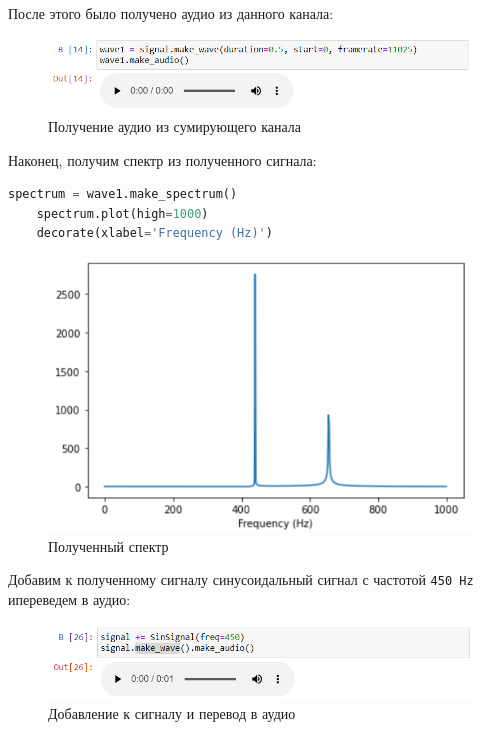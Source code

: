 \documentclass[a4paper]{article}
\begin{document}
            После этого было получено аудио из данного канала:
            
             \begin{figure}[H]
                \centering
                \includegraphics[width=\textwidth]{spectr_sum_audio.png}
                \caption{Получение аудио из сумирующего канала}
                \label{fig:spectr_sum_audio}
            \end{figure}
            
            Наконец, получим спектр из полученного сигнала:

\begin{lstlisting}[language=Python, caption= Получение спектра]
    spectrum = wave1.make_spectrum()
    spectrum.plot(high=1000)
    decorate(xlabel='Frequency (Hz)')
\end{lstlisting}
            
            \begin{figure}[H]
                \centering
                \includegraphics[width=\textwidth]{spectr_sum_result.png}
                \caption{Полученный спектр}
                \label{fig:spectr_sum_result}
            \end{figure}
            
            Добавим к полученному сигналу синусоидальный сигнал с частотой \texttt{450 Hz} ипереведем в аудио:
            
            \begin{figure}[H]
                \centering
                \includegraphics[width=\textwidth]{spectr_sum_add.png}
                \caption{Добавление к сигналу и перевод в аудио}
                \label{fig:spectr_sum_add}
            \end{figure}
            
\end{document}
